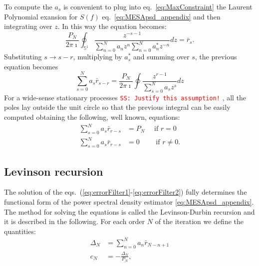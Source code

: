 \documentclass[twocolumn,showpacs,preprintnumbers,nofootinbib,prd,
superscriptaddress,10pt]{revtex4-1}
\newcommand{\sschmidt}[1]{{\textcolor{red}{\texttt{SS: #1}} }}
\begin{document}
To compute the $a_s$ is convenient to plug into eq.~\eqref{eq:MaxConstraint} the Laurent Polynomial exansion for $S(f)$ eq.~\eqref{eq:MESApsd_appendix} and then integrating over $z$. In this way the equation becomes:
\begin{equation}
    \label{eq:contourintegral}
   \frac{P_N}{2 \pi \imath} \oint _{\mathbb S^1}\frac{z^{-s - 1}}{\sum_{n = 0}^N a_n z^n \sum_{n = 0}^N a^*_n z^{-n}}dz = \bar r_s. 
\end{equation}
Substituting $s \to s - r$, multiplying by $a^*_s$ and summing over $s$, the previous equation becomes 
\begin{equation}
    \label{eq:errorFilter}
    \sum_{s = 0}^N a_s \bar r_{s - r} = \frac{P_N}{2 \pi \imath}\oint \frac{z^{r -1}}{\sum_{s = 0}^N a_s z^s}dz
\end{equation}
For a wide-sense stationary processes \sschmidt{Justify this assumption!}, all the poles lay outside the unit circle so that the previous integral can be easily computed obtaining the following, well known, equations: 
\begin{align}
    \label{eq:errorFilter1}
    \sum_{s = 0}^N a_s \bar r_{r - s} &= P_N \quad \text{ if } r = 0 \\ \label{eq:errorFilter2}
    \sum_{s = 0}^N a_s \bar r_{r - s} & = 0 \qquad \text{ if } r \neq 0.
\end{align}

\subsection{Levinson recursion} \label{sec:LevinsonRecursion}
The solution of the eqs.~(\ref{eq:errorFilter1}-\ref{eq:errorFilter2}) fully determines the functional form of the power spectral density estimator \eqref{eq:MESApsd_appendix}.
The method for solving the equations is called the Levinson-Durbin recursion \cite{doi:10.1002/sapm1946251261} and it is described in the following.
For each order $N$ of the iteration we define the quantities:
\begin{align}
\Delta_N &= \sum_{n = 0}^{N} a_n \bar{r}_{N - n + 1} \\ 
c_N &= - \frac{\Delta_N}{P_N},
\end{align}
\end{document}
